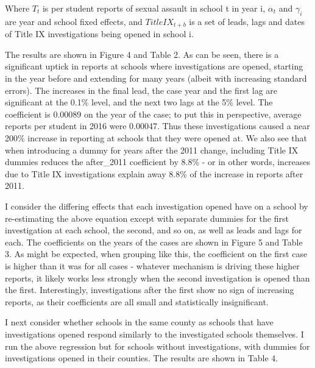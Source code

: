 \documentclass[AER,draftmode]{AEA}
\begin{document}
Where $T_{t}$ is per student reports of sexual assault in school t in year i, $\alpha_{t}$ and $\gamma_{i}$ are year and school fixed effects, and $TitleIX_{t+b}$ is a set of leads, lags and dates of Title IX investigations being opened in school i. 

The results are shown in Figure 4 and Table 2. As can be seen, there is a significant uptick in reports at schools where investigations are opened, starting in the year before and extending for many years (albeit with increasing standard errors). The increases in the final lead, the case year and the first lag are significant at the 0.1\% level, and the next two lags at the 5\% level. The coefficient is 0.00089 on the year of the case; to put this in perspective, average reports per student in 2016 were 0.00047. Thus these investigations caused a near 200\% increase in reporting at schools that they were opened at. We also see that when introducing a dummy for years after the 2011 change, including Title IX dummies reduces the after\_2011 coefficient by 8.8\% - or in other words, increases due to Title IX investigations explain away 8.8\% of the increase in reports after 2011.

I consider the differing effects that each investigation opened have on a school by re-estimating the above equation except with separate dummies for the first investigation at each school, the second, and so on, as well as leads and lags for each. The coefficients on the years of the cases are shown in Figure 5 and Table 3. As might be expected, when grouping like this, the coefficient on the first case is higher than it was for all cases - whatever mechanism is driving these higher reports, it likely works less strongly when the second investigation is opened than the first. Interestingly, investigations after the first show no sign of increasing reports, as their coefficients are all small and statistically insignificant. 

I next consider whether schools in the same county as schools that have investigations opened respond similarly to the investigated schools themselves. I run the above regression but for schools without investigations, with dummies for investigations opened in their counties. The results are shown in Table 4. 
\end{document}
